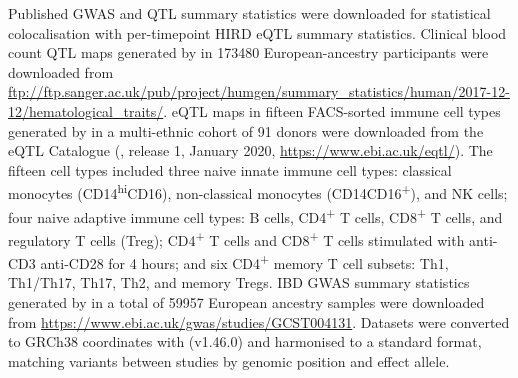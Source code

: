 Published \gls{GWAS} and \gls{QTL} summary statistics were downloaded for statistical colocalisation with per-timepoint \gls{HIRD} \gls{eQTL} summary statistics.
Clinical blood count \gls{QTL} maps generated by \textcite{astle2016AllelicLandscapeHuman} in \num{173480} European-ancestry participants were downloaded from \url{ftp://ftp.sanger.ac.uk/pub/project/humgen/summary_statistics/human/2017-12-12/hematological_traits/}.
\gls{eQTL} maps in fifteen \gls{FACS}-sorted immune cell types generated by \textcite{schmiedel2018ImpactGeneticPolymorphisms} in a multi-ethnic cohort of 91 donors were downloaded from the eQTL Catalogue (\autocite{kerimov2020EQTLCatalogueCompendium}, release 1, January 2020, \url{https://www.ebi.ac.uk/eqtl/}).
The fifteen cell types included
three naive innate immune cell types: 
    classical monocytes (CD14\textsuperscript{hi}CD16\textsuperscript{\textminus}),
    non-classical monocytes (CD14\textsuperscript{\textminus}CD16\textsuperscript{+}),
    and \gls{NK} cells;
four naive adaptive immune cell types:
    B cells, CD4\textsuperscript{+} T cells, CD8\textsuperscript{+} T cells, and regulatory T cells (Treg);
CD4\textsuperscript{+} T cells and CD8\textsuperscript{+} T cells stimulated with anti-CD3 anti-CD28 for 4 hours;
and six CD4\textsuperscript{+} memory T cell subsets:
    Th1, Th1/Th17, Th17, Th2, and memory Tregs.
\Gls{IBD} \gls{GWAS} summary statistics generated by \textcite{delange2017GenomewideAssociationStudy} in a total of \num{59957} European ancestry samples were downloaded from \url{https://www.ebi.ac.uk/gwas/studies/GCST004131}.
Datasets were converted to GRCh38 coordinates with  (v1.46.0) \autocite{lawrence2009RtracklayerPackageInterfacing} and harmonised to a standard format, matching variants between studies by genomic position and effect allele.

